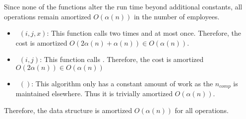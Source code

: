\documentclass[12pt,twoside]{article}
\begin{document}
\begin{problems}
Since none of the functions alter the run time beyond additional constants, all
operations remain amortized $O(\alpha(n))$ in the number of employees.

\begin{itemize}
    \item\ $(i, j, x)$: This function calls 
        two times and  at most once. Therefore, the cost is
        amortized $O(2 \alpha(n) + \alpha(n)) \in O(\alpha(n))$.
    \item\ $(i, j)$: This function calls .
        Therefore, the cost is amortized $O(2 \alpha(n)) \in O(\alpha(n))$
    \item\ $()$: This algorithm only has a constant amount of
        work as the $n_{comp}$ is maintained elsewhere. Thus it is trivially
        amortized $O(\alpha(n))$.
\end{itemize}

Therefore, the data structure is amortized $O(\alpha(n))$ for all operations.

\end{problems}
\end{document}
